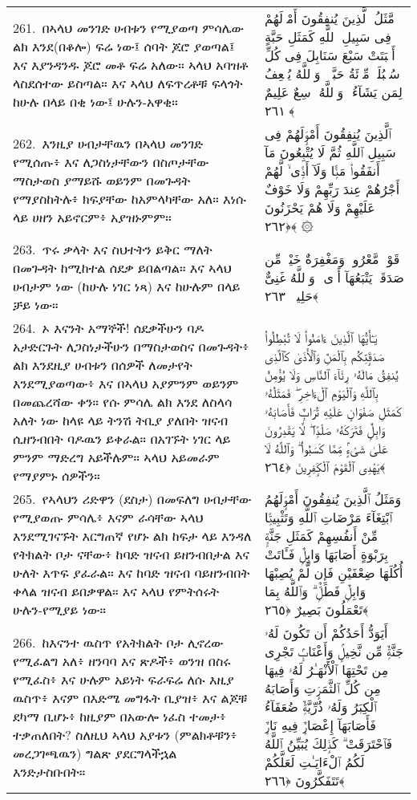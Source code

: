 \documentclass[11pt,a4paper,oneside]{article}%
\newcommand{\mytextarabic}[1]{\textarabic{ #1 \flushright}}
\begin{document}
\begin{longtable}{%
  @{}
    p{}
  @{~~~}
    p{}
    @{}
}
261.\ በኣላህ መንገድ ሀብቱን የሚያወጣ ምሳሌው ልክ እንደ(በቆሎ) ፍሬ ነው፤ ሰባት ጆሮ ያወጣል፤ እና እያንዳንዱ ጆሮ መቶ ፍሬ አለው። ኣላህ አባዝቶ ላስደሰተው ይስጣል። እና ኣላህ ለፍጥረቶቹ ፍላጎት ከሁሉ በላይ በቂ ነው፤ ሁሉን-አዋቂ። &  \mytextarabic{ مَّثَلُ ٱلَّذِينَ يُنفِقُونَ أَمْوَٟلَهُمْ فِى سَبِيلِ ٱللَّهِ كَمَثَلِ حَبَّةٍ أَنۢبَتَتْ سَبْعَ سَنَابِلَ فِى كُلِّ سُنۢبُلَةٍۢ مِّا۟ئَةُ حَبَّةٍۢ ۗ وَٱللَّهُ يُضَٟعِفُ لِمَن يَشَآءُ ۗ وَٱللَّهُ وَٟسِعٌ عَلِيمٌ ﴿٢٦١﴾}\\
262.\ እንዚያ ሀብታቸዉን በኣላህ መንገድ የሚሰጡ፥ እና ለጋስነታቸውን በስጦታቸው ማስታወስ ያማይሹ ወይንም በመጉዳት የማያስከትሉ፥ ክፍያቸው ከአምላካቸው አለ። እነሱ ላይ ሀዘን አይኖርም፥ አያዝኑምም። &  \mytextarabic{ٱلَّذِينَ يُنفِقُونَ أَمْوَٟلَهُمْ فِى سَبِيلِ ٱللَّهِ ثُمَّ لَا يُتْبِعُونَ مَآ أَنفَقُوا۟ مَنًّۭا وَلَآ أَذًۭى ۙ لَّهُمْ أَجْرُهُمْ عِندَ رَبِّهِمْ وَلَا خَوْفٌ عَلَيْهِمْ وَلَا هُمْ يَحْزَنُونَ ﴿٢٦٢﴾ ۞}\\
263.\ ጥሩ ቃላት እና ስህተትን ይቅር ማለት በመጉዳት ከሚከተል ሰደቃ ይበልጣል። እና ኣላህ ሀብታም ነው (ከሁሉ ነገር ነጻ) እና ከሁሉም በላይ ቻይ ነው። &  \mytextarabic{  قَوْلٌۭ مَّعْرُوفٌۭ وَمَغْفِرَةٌ خَيْرٌۭ مِّن صَدَقَةٍۢ يَتْبَعُهَآ أَذًۭى ۗ وَٱللَّهُ غَنِىٌّ حَلِيمٌۭ ﴿٢٦٣﴾}\\
264.\ ኦ እናንት አማኞች! ሰደቃችሁን ባዶ አታድርጉት ለጋስነታችሁን በማስታወስና በመጉዳት፥ ልክ እንደዚያ ሀብቱን በሰዎች ለመታየት እንደሚያወጣው፥ እና በኣላህ አያምንም ወይንም በመጨረሻው ቀን። የሱ ምሳሌ ልክ እንደ ለስላሳ አለት ነው ከላዩ ላይ ትንሽ ትቢያ ያለበት ዝናብ ሲዘንብበት ባዶዉን ይቀራል። በአገኙት ነገር ላይ ምንም ማድረግ አይችሉም። ኣላህ አይመራም የማያምኑ ሰዎችን። &  \mytextarabic{يَـٰٓأَيُّهَا ٱلَّذِينَ ءَامَنُوا۟ لَا تُبْطِلُوا۟ صَدَقَٟتِكُم بِٱلْمَنِّ وَٱلْأَذَىٰ كَٱلَّذِى يُنفِقُ مَالَهُۥ رِئَآءَ ٱلنَّاسِ وَلَا يُؤْمِنُ بِٱللَّهِ وَٱلْيَوْمِ ٱلْءَاخِرِ ۖ فَمَثَلُهُۥ كَمَثَلِ صَفْوَانٍ عَلَيْهِ تُرَابٌۭ فَأَصَابَهُۥ وَابِلٌۭ فَتَرَكَهُۥ صَلْدًۭا ۖ لَّا يَقْدِرُونَ عَلَىٰ شَىْءٍۢ مِّمَّا كَسَبُوا۟ ۗ وَٱللَّهُ لَا يَهْدِى ٱلْقَوْمَ ٱلْكَٟفِرِينَ ﴿٢٦٤﴾}\\
265.\ የኣላህን ሪድዋን (ደስታ) በመፍለግ ሀብታቸው የሚያወጡ ምሳሌ፥ እናም ራሳቸው ኣላህ እንደሚገናኙት እርግጠኛ የሆኑ ልክ ከፍታ ላይ እንዳለ የትክልት ቦታ ናቸው፥ ከባድ ዝናብ ይዘንብበታል እና ሁለት እጥፍ ያፈራል። እና ከባድ ዝናብ ባይዘንብበት ቀላል ዝናብ ይበቃዋል። እና ኣላህ የምትሰሩት ሁሉን-የሚያይ ነው። &  \mytextarabic{وَمَثَلُ ٱلَّذِينَ يُنفِقُونَ أَمْوَٟلَهُمُ ٱبْتِغَآءَ مَرْضَاتِ ٱللَّهِ وَتَثْبِيتًۭا مِّنْ أَنفُسِهِمْ كَمَثَلِ جَنَّةٍۭ بِرَبْوَةٍ أَصَابَهَا وَابِلٌۭ فَـَٔاتَتْ أُكُلَهَا ضِعْفَيْنِ فَإِن لَّمْ يُصِبْهَا وَابِلٌۭ فَطَلٌّۭ ۗ وَٱللَّهُ بِمَا تَعْمَلُونَ بَصِيرٌ ﴿٢٦٥﴾}\\
266.\ ከእናንተ ዉስጥ የአትክልት ቦታ ሊኖረው የሚፈልግ አለ፥ ዘንባባ እና ጽዶች፥ ወንዝ በስሩ የሚፈስ፥ እና ሁሉም አይነት ፍራፍሬ ለሱ እዚያ ዉስጥ፥ እናም በእድሜ መግፋት ቢያዝ፥ እና ልጆቹ ደካማ ቢሆኑ፥ ከዚያም በአውሎ ነፈስ ተመታ፥ ተቃጠለበት? ስለዚህ ኣላህ አያቱን (ምልክቶቹን፥ መረጋገጫዉን) ግልጽ ያደርግላችኋል እንድታስቡበት። &  \mytextarabic{أَيَوَدُّ أَحَدُكُمْ أَن تَكُونَ لَهُۥ جَنَّةٌۭ مِّن نَّخِيلٍۢ وَأَعْنَابٍۢ تَجْرِى مِن تَحْتِهَا ٱلْأَنْهَـٰرُ لَهُۥ فِيهَا مِن كُلِّ ٱلثَّمَرَٟتِ وَأَصَابَهُ ٱلْكِبَرُ وَلَهُۥ ذُرِّيَّةٌۭ ضُعَفَآءُ فَأَصَابَهَآ إِعْصَارٌۭ فِيهِ نَارٌۭ فَٱحْتَرَقَتْ ۗ كَذَٟلِكَ يُبَيِّنُ ٱللَّهُ لَكُمُ ٱلْءَايَـٰتِ لَعَلَّكُمْ تَتَفَكَّرُونَ ﴿٢٦٦﴾}\\

\end{longtable}
\end{document}

